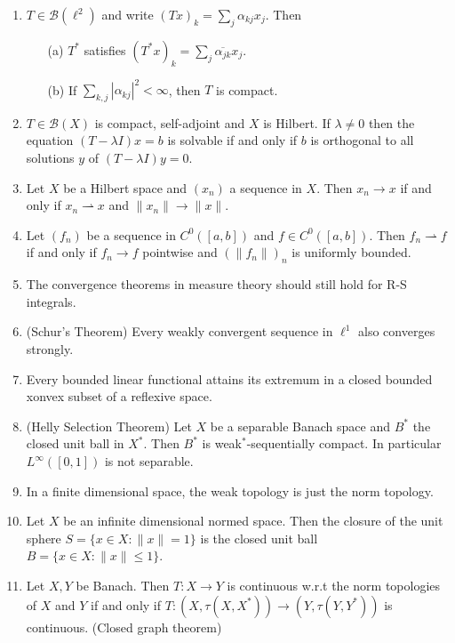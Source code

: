 \documentclass{article}
\theoremstyle{definition}
\newcommand{\B}{\mathcal B}
\newcommand{\ru}{\rightharpoonup}
\begin{document}
\begin{enumerate}
	\item $T \in \B(\ell^2)$ and write $(T x)_k = \sum_j \alpha_{kj} x_j$.
		Then
		\begin{enumerate}
			\item[(a)] $T^*$ satisfies $(T^* x)_k = \sum_j \overline{\alpha_{jk}} x_j$.

			\item[(b)] If $\sum_{k, j} |\alpha_{kj}|^2 < \infty$, then $T$ is compact.
		\end{enumerate}

	\item $T \in \B(X)$ is compact, self-adjoint and $X$ is Hilbert.
		If $\lambda \neq 0$ then the equation $(T - \lambda I) x = b$ is solvable if and only if $b$ is orthogonal to all solutions $y$ of $(T - \lambda I) y = 0$.

	\item Let $X$ be a Hilbert space and $(x_n)$ a sequence in $X$.
		Then $x_n \to x$ if and only if $x_n \ru x$ and $\|x_n\| \to \|x\|$.

	\item Let $(f_n)$ be a sequence in $C^0([a, b])$ and $f \in C^0([a, b])$.
		Then $f_n \ru f$ if and only if $f_n \to f$ pointwise and $(\|f_n\|)_n$ is uniformly bounded.

	\item The convergence theorems in measure theory should still hold for R-S integrals.

	\item (Schur's Theorem) Every weakly convergent sequence in $\ell^1$ also converges strongly.

	\item Every bounded linear functional attains its extremum in a closed bounded xonvex subset of a reflexive space.

	\item (Helly Selection Theorem) Let $X$ be a separable Banach space and $B^*$ the closed unit ball in $X^*$. 
		Then $B^*$ is weak$^*$-sequentially compact. 
		In particular $L^\infty([0, 1])$ is not separable.

	\item In a finite dimensional space, the weak topology is just the norm topology.

	\item Let $X$ be an infinite dimensional normed space.
		Then the closure of the unit sphere $S = \{x \in X: \|x\| = 1\}$ is the closed unit ball $B = \{x \in X: \|x\| \leq 1\}$.	

	\item Let $X, Y$ be Banach.
		Then $T: X \to Y$ is continuous w.r.t the norm topologies of $X$ and $Y$ if and only if $T: (X, \tau(X, X^*)) \to (Y, \tau(Y, Y^*))$ is continuous. (Closed graph theorem)


\end{enumerate}
\end{document}
